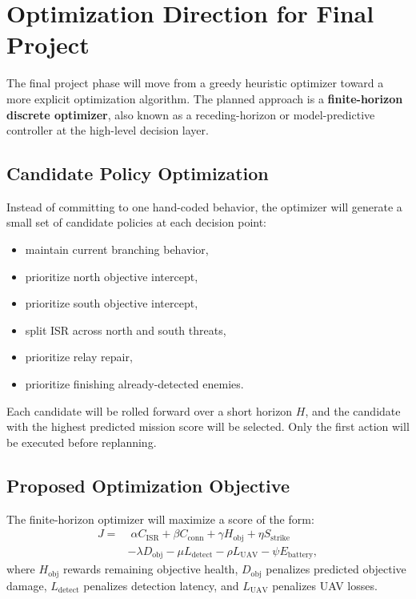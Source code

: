 \documentclass[conference]{IEEEtran}
\begin{document}
\section{Optimization Direction for Final Project}
The final project phase will move from a greedy heuristic optimizer toward a
more explicit optimization algorithm. The planned approach is a
\textbf{finite-horizon discrete optimizer}, also known as a receding-horizon or
model-predictive controller at the high-level decision layer.

\subsection{Candidate Policy Optimization}
Instead of committing to one hand-coded behavior, the optimizer will generate a
small set of candidate policies at each decision point:
\begin{itemize}
    \item maintain current branching behavior,
    \item prioritize north objective intercept,
    \item prioritize south objective intercept,
    \item split ISR across north and south threats,
    \item prioritize relay repair,
    \item prioritize finishing already-detected enemies.
\end{itemize}

Each candidate will be rolled forward over a short horizon $H$, and the
candidate with the highest predicted mission score will be selected. Only the
first action will be executed before replanning.

\subsection{Proposed Optimization Objective}
The finite-horizon optimizer will maximize a score of the form:
\begin{equation}
\begin{aligned}
J = &\;\alpha C_{\text{ISR}}
+ \beta C_{\text{conn}}
+ \gamma H_{\text{obj}}
+ \eta S_{\text{strike}} \\
&- \lambda D_{\text{obj}}
- \mu L_{\text{detect}}
- \rho L_{\text{UAV}}
- \psi E_{\text{battery}},
\end{aligned}
\end{equation}
where $H_{\text{obj}}$ rewards remaining objective health, $D_{\text{obj}}$
penalizes predicted objective damage, $L_{\text{detect}}$ penalizes detection
latency, and $L_{\text{UAV}}$ penalizes UAV losses.
\end{document}
